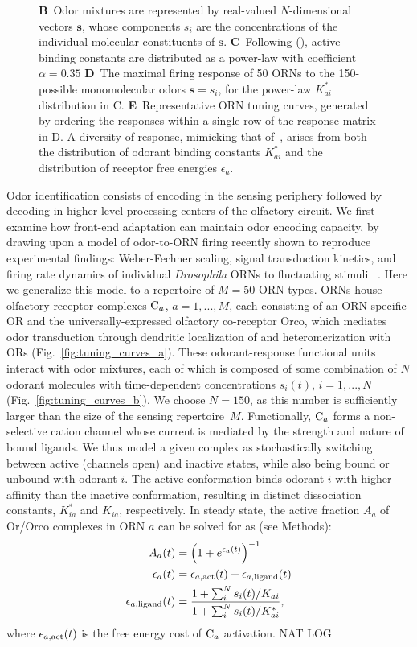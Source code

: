 \begin{figure}[!tb]
{{		\textbf{B}~Odor mixtures are represented by real-valued $N$-dimensional vectors $\mathbf s$, whose components $s_i$ are the concentrations of  the individual molecular constituents  of $\mathbf s$. 
		\textbf{C}~Following (), active binding constants are distributed as a power-law with coefficient $\alpha=0.35$
		\textbf{D}~The maximal firing response of 50 ORNs to the 150-possible monomolecular odors $\mathbf s = s_i$, for the power-law $K^*_{ai}$ distribution in C.
		\textbf{E}~Representative ORN tuning curves, generated by ordering the responses within a single row of the response matrix in D. A diversity of response, mimicking that of~\cite{hallem_carlson}, arises from both the distribution of odorant binding constants $K^*_{ai}$ and the distribution of receptor free energies $\epsilon_a$.}}
		\label{fig:tuning_curves}
\end{figure}

Odor identification consists of encoding in the sensing periphery followed by decoding in higher-level processing centers of the olfactory circuit. We first examine how front-end adaptation can maintain odor encoding capacity,  by  drawing upon a model of odor-to-ORN firing recently shown to reproduce experimental findings: Weber-Fechner scaling, signal transduction kinetics, and firing rate dynamics of individual \textit{Drosophila} ORNs to fluctuating stimuli ~\cite{srinivas_elife}. Here we generalize this model to a repertoire of $M=50$ ORN types. ORNs house olfactory receptor complexes $\textup{C}_a$, $a=1,...,M$, each consisting of an ORN-specific OR and the universally-expressed olfactory co-receptor Orco, which mediates odor transduction through dendritic localization of and heteromerization with ORs (Fig.~\ref{fig:tuning_curves_a}). These odorant-response functional units interact with odor mixtures, each of which is composed of some combination of $N$ odorant molecules with time-dependent concentrations $s_i(t)$, $i=1,...,N$ (Fig.~\ref{fig:tuning_curves_b}). We choose $N=150$, as this number is sufficiently larger than the size of the sensing repertoire~$M$. Functionally, $\textup{C}_a$ forms a non-selective cation channel whose current is mediated by the strength and nature of bound ligands. We thus model a given complex as stochastically switching between active (channels open) and inactive states, while also being bound or unbound with odorant $i$. The active conformation binds odorant $i$ with higher affinity than the inactive conformation, resulting in distinct dissociation constants, $K^*_{ia}$ and $K_{ia}$, respectively. In steady state, the active fraction $A_a$ of Or/Orco complexes in ORN $a$ can be solved for as (see Methods):
\begin{align}
A_a(t) &= \left(1 + e^{\epsilon_a(t)}\right)^{-1} \nonumber \\
\epsilon_a(t) &= \epsilon_{a, \textup{act}}(t) + \epsilon_{a, \textup{ligand}}(t) \nonumber \\
\epsilon_{a, \textup{ligand}}(t) &= \frac{1 + \sum_i^N s_i(t)/K_{ai}}{1 + \sum_i^N s_i(t)/K^*_{ai}},
\label{eq:steady_state_act_OR}
\end{align}
where $\epsilon_{a, \textup{act}}(t)$ is the free energy cost of $\textup{C}_a$ activation. NAT LOG


